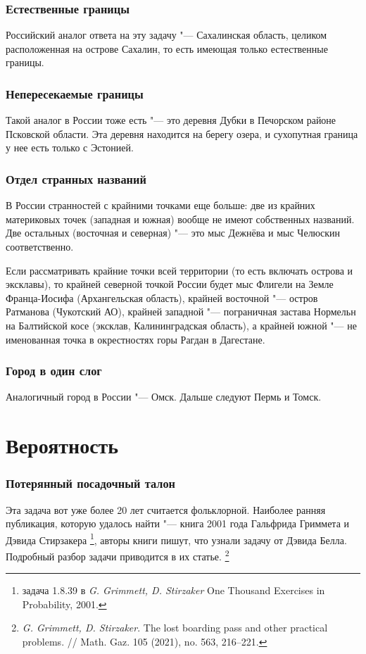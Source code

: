 \documentclass[twoside]{book}
\begin{document}
\subsubsection{Естественные границы}
Российский аналог ответа на эту задачу "--- Сахалинская область, целиком расположенная на острове Сахалин,
то есть имеющая только естественные границы.

\subsubsection{Непересекаемые границы}
Такой аналог в России тоже есть "--- это деревня Дубки в Печорском  районе Псковской области.
Эта деревня находится на берегу озера, и сухопутная граница у нее есть только с Эстонией.

\subsubsection{Отдел странных названий}
В России странностей с крайними точками еще больше: две из крайних материковых точек (западная и южная) 
вообще не имеют собственных названий. Две остальных (восточная и северная) "--- это мыс Дежнёва и мыс Челюскин
соответственно. 

Если рассматривать крайние точки всей территории (то есть включать острова и эксклавы), то крайней северной
точкой России будет мыс Флигели на Земле Франца-Иосифа (Архангельская область), крайней восточной "--- остров Ратманова (Чукотский АО), 
крайней западной "--- пограничная застава Нормельн на Балтийской косе (эксклав, Калининградская область), 
а крайней южной "--- не именованная точка в окрестностях горы Рагдан в Дагестане.

\subsubsection{Город в один слог}
Аналогичный город в России "--- Омск.
Дальше следуют Пермь и Томск.

\section{Вероятность}

\subsubsection{Потерянный посадочный талон}
Эта задача вот уже более 20 лет считается фольклорной.
Наиболее ранняя публикация, которую удалось найти "--- книга 2001 года Гальфрида Гриммета и Дэвида Стирзакера%
\footnote{задача 1.8.39 в \emph{G. Grimmett, D. Stirzaker} One Thousand Exercises in Probability, 2001.},
авторы книги пишут, что узнали задачу от Дэвида Белла.
Подробный разбор задачи приводится в их статье.%
\footnote{\emph{G. Grimmett, D. Stirzaker}.
The lost boarding pass and other practical problems.
/\!/
Math. Gaz. 105 (2021), no. 563, 216--221.}
\end{document}
